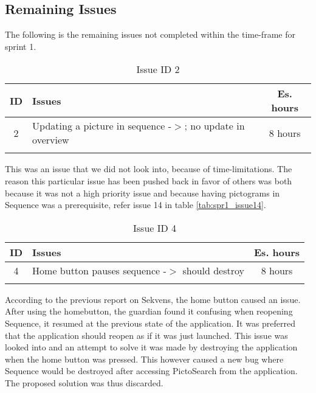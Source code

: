\subsection{Remaining Issues}\label{subsec:remain_issues}
The following is the remaining issues not completed within the time-frame for sprint 1.

\begin{longtable} { | c | p{12cm} | c | } 
\hline
	ID 	&	Issues	&		 Es. hours \\\hline
	2	&	Updating a picture in sequence -$>$; no update in overview	&	8 hours	\\\hline
	\caption{Issue ID 2}
\label{tab:spr1_overviewupdate}
\end{longtable}
This was an issue that we did not look into, because of time-limitations. The reason this particular issue has been pushed back in favor of others was both because it was not a high priority issue and because having pictograms in Sequence was a prerequisite, refer issue 14 in table \ref{tab:spr1_issue14}. 

\begin{longtable} { | c | p{12cm} | c | } 
\hline
	ID 	&	Issues	&		 Es. hours \\\hline
	4	&	Home button pauses sequence -$>$ should destroy 	&	8 hours	\\\hline
	\caption{Issue ID 4}
\label{tab:spr1_homebtndestroy}
\end{longtable}

According to the previous report on Sekvens\citep{Zebra}, the home button caused an issue. After using the homebutton, the guardian found it confusing when reopening Sequence, it resumed at the previous state of the application. It was preferred that the application should reopen as if it was just launched. This issue was looked into and an attempt to solve it was made by destroying the application when the home button was pressed. This however caused a new bug where Sequence would be destroyed after accessing PictoSearch from the application. The proposed solution was thus discarded.
